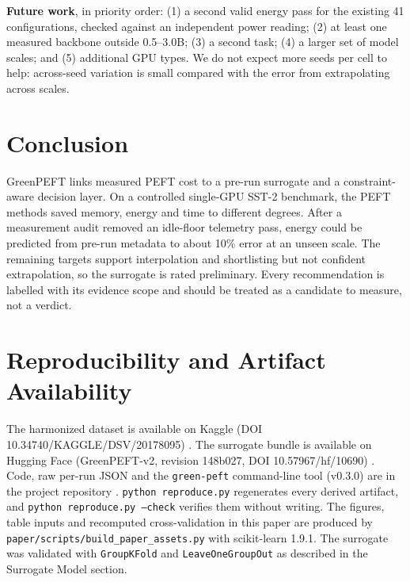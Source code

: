 \documentclass[conference]{IEEEtran}
\begin{document}
\textbf{Future work}, in priority order: (1) a second valid energy pass for the existing 41
configurations, checked against an independent power reading; (2) at least one measured
backbone outside 0.5--3.0B; (3) a second task; (4) a larger set of model scales; and
(5) additional GPU types. We do not expect more seeds per cell to help: across-seed variation
is small compared with the error from extrapolating across scales.

\section{Conclusion}

GreenPEFT links measured PEFT cost to a pre-run surrogate and a constraint-aware decision
layer. On a controlled single-GPU SST-2 benchmark, the PEFT methods saved memory, energy and
time to different degrees. After a measurement audit removed an idle-floor telemetry pass,
energy could be predicted from pre-run metadata to about 10\% error at an unseen scale. The
remaining targets support interpolation and shortlisting but not confident extrapolation, so
the surrogate is rated preliminary. Every recommendation is labelled with its evidence scope
and should be treated as a candidate to measure, not a verdict.

\section*{Reproducibility and Artifact Availability}

The harmonized dataset is available on Kaggle (DOI 10.34740/KAGGLE/DSV/20178095)
\cite{tanzil2026data}. The surrogate bundle is available on Hugging Face (GreenPEFT-v2,
revision 148b027, DOI 10.57967/hf/10690) \cite{tanzil2026model}. Code, raw per-run JSON and
the \texttt{green-peft} command-line tool (v0.3.0) are in the project repository
\cite{tanzil2026code}. \texttt{python reproduce.py} regenerates every derived artifact, and
\texttt{python reproduce.py --check} verifies them without writing. The figures, table inputs
and recomputed cross-validation in this paper are produced by
\texttt{paper/scripts/build\_paper\_assets.py} with scikit-learn 1.9.1. The surrogate was
validated with \texttt{GroupKFold} and \texttt{LeaveOneGroupOut} as described in the
Surrogate Model section.



\end{document}

